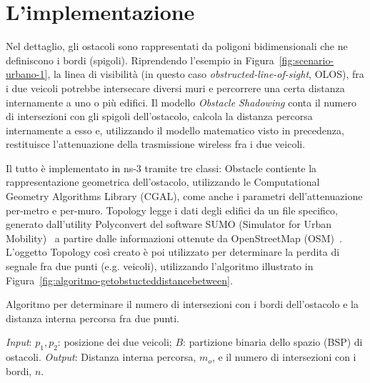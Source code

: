 \section{L'implementazione}
Nel dettaglio, gli ostacoli sono rappresentati da poligoni bidimensionali che ne definiscono i bordi (spigoli).
Riprendendo l'esempio in Figura~\ref{fig:scenario-urbano-1}, la linea di visibilità (in questo caso \textit{obstructed-line-of-sight}, OLOS), fra i due veicoli potrebbe
intersecare diversi muri e percorrere una certa distanza internamente a uno o più edifici.
Il modello \textit{Obstacle Shadowing} conta il numero di intersezioni con gli spigoli dell'ostacolo, calcola la distanza percorsa internamente a esso e, utilizzando
il modello matematico visto in precedenza, restituisce l'attenuazione della trasmissione wireless fra i due veicoli.

Il tutto è implementato in ns-3 tramite tre classi: \textsf{Obstacle} contiente la rappresentazione geometrica dell'ostacolo, utilizzando le Computational Geometry Algorithms Library (CGAL),
come anche i parametri dell'attenuazione per-metro e per-muro.
\textsf{Topology} legge i dati degli edifici da un file specifico, generato dall'utility Polyconvert del software SUMO (Simulator for Urban Mobility)~\cite{sumoWebsite}
a partire dalle informazioni ottenute da OpenStreetMap (OSM)~\cite{osmWebsite}.
L'oggetto \textsf{Topology} così creato è poi utilizzato per determinare la perdita di segnale fra due punti (e.g. veicoli), utilizzando l'algoritmo illustrato
in Figura~\ref{fig:algoritmo-getobstucteddistancebetween}.
%
\begin{algorithm}[!h]
\caption{Algoritmo per determinare il numero di intersezioni con i bordi dell'ostacolo e la distanza interna percorsa fra due punti.}\label{fig:algoritmo-getobstucteddistancebetween}
\begin{algorithmic}[1]
	\BState{}\emph{Input}: $p_1, p_2$: posizione dei due veicoli; $B$: partizione binaria dello spazio (BSP) di ostacoli.
	\BState{}\emph{Output}: Distanza interna percorsa, $m_o$, e il numero di intersezioni con i bordi, $n$.
				\EndIf{}
			\EndFor{}
		\EndIf{}
	\EndFor{}
	\EndProcedure{}
\end{algorithmic}
\end{algorithm}
%
